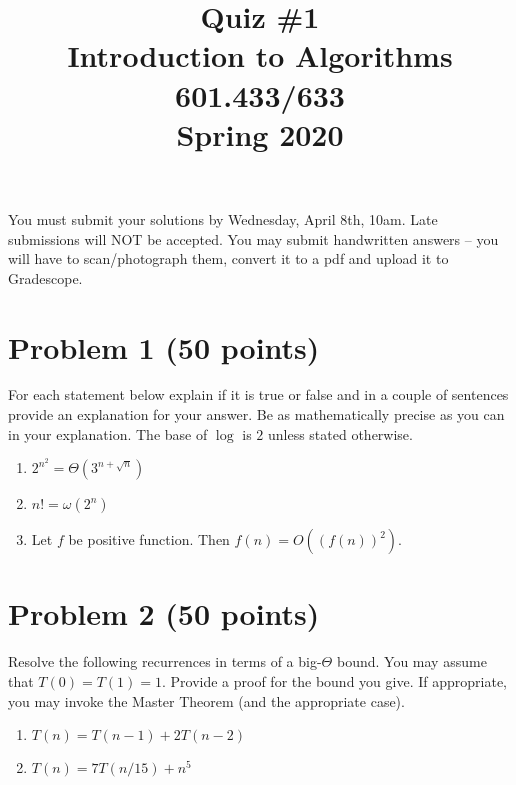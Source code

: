 \documentclass[letterpaper, 11pt]{article}
\begin{document}
\setlength{\parindent}{0em}
\setlength{\parskip}{1em}

\title{ Quiz \#1 \\ Introduction to Algorithms \\ 601.433/633 \\Spring 2020}
\date{}
\maketitle
\vspace{-5em}
You must submit your solutions by Wednesday, April 8th, 10am. Late submissions will NOT be accepted. You may submit handwritten answers -- you will have to scan/photograph them, convert it to a pdf and upload it to Gradescope.

\section{ Problem 1 (50 points)}
For each statement below explain if it is true or false and in a couple of sentences provide an explanation for your answer. Be as mathematically precise as you can in your explanation. The base of $\log$ is $2$ unless stated otherwise.

\begin{enumerate}

	\item $2^{n^2} = \Theta(3^{n + \sqrt{n}})$

	
	\item  $n! = \omega(2^n)$
	

	\item  Let $f$ be positive function. Then $f(n) = O((f(n))^2)$.
	

\end{enumerate}


\newpage
\section{Problem 2 (50 points)}

Resolve the following recurrences in terms of a big-$\Theta$ bound. You may assume that $T(0) = T(1) = 1$. Provide a proof for the bound you give. If appropriate, you may invoke the Master Theorem (and the appropriate case).

\begin{enumerate}

\item $T(n) = T(n-1) + 2T(n-2)$


\item $T(n) = 7T(n/15) + n^5$

\end{enumerate}
\end{document}
